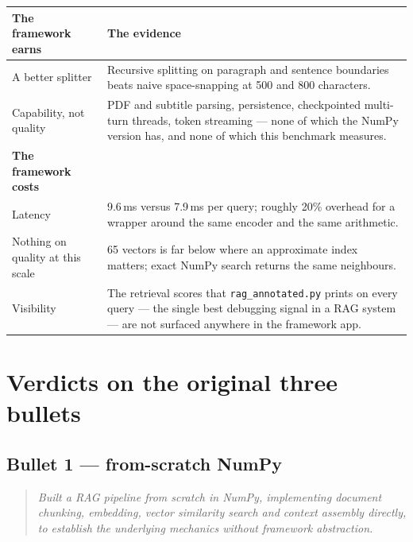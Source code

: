 \documentclass[11pt,a4paper]{article}
\begin{document}
\begin{longtable}{@{}R{4.6cm}R{10.6cm}@{}}
\toprule
\textbf{The framework earns} & \textbf{The evidence} \\
\midrule
\endhead
A better splitter &
Recursive splitting on paragraph and sentence boundaries beats naive
space-snapping at 500 and 800 characters. \\
Capability, not quality &
PDF and subtitle parsing, persistence, checkpointed multi-turn threads, token
streaming --- none of which the NumPy version has, and none of which this
benchmark measures. \\
\midrule
\textbf{The framework costs} & \\
\midrule
Latency & 9.6\,ms versus 7.9\,ms per query; roughly 20\% overhead for a wrapper
around the same encoder and the same arithmetic. \\
Nothing on quality at this scale &
65 vectors is far below where an approximate index matters; exact NumPy search
returns the same neighbours. \\
Visibility &
The retrieval scores that \texttt{rag\_annotated.py} prints on every query --- the
single best debugging signal in a RAG system --- are not surfaced anywhere in
the framework app. \\
\bottomrule
\end{longtable}

\section{Verdicts on the original three bullets}

\subsection{Bullet 1 --- from-scratch NumPy}\label{sec:bullet1}

\begin{quote}\itshape
Built a RAG pipeline from scratch in NumPy, implementing document chunking,
embedding, vector similarity search and context assembly directly, to establish
the underlying mechanics without framework abstraction.
\end{quote}
\end{document}

